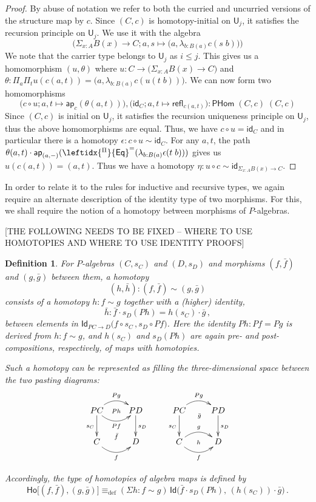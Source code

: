 \documentclass[10pt,a4paper,oneside,reqno]{amsart}
\numberwithin{equation}{section}
\theoremstyle{mythm}
\theoremstyle{mydef}
\newtheorem{definition}[theorem]{Definition}
\theoremstyle{myrmk}
\newcommand{\deq}{\equiv}
\newcommand{\defeq}{\deq_{\mathrm{def}}}
\newcommand{\idfun}[1]{\mathsf{id}_{#1}}
\newcommand{\comp}{\circ}
\newcommand{\ct}{\cdot}
\newcommand{\funext}{\leftidx{^\Pi}{\mathsf{Eq}}^{=}}
\newcommand{\prd}[1]{\Pi_{#1}}
\newcommand{\sm}[1]{\Sigma_{#1}}
\newcommand{\lam}[1]{\lambda_{#1}}
\newcommand{\app}{\mathsf{ap}}
\newcommand{\Id}{\mathsf{Id}}
\newcommand{\id}[1]{\Id_{#1}}
\newcommand{\refl}{\mathsf{refl}}
\newcommand{\UU}{\mathsf{U}}
\newcommand{\Ho}{\mathsf{Ho}}
\newcommand{\WHom}{\mathsf{PHom}}
\begin{document}
\begin{proof}
By abuse of notation we refer to both the curried and uncurried versions of the structure map by $c$. Since $(C,c)$ is homotopy-initial on $\UU_j$, it satisfies the recursion principle on $\UU_j$. We use it with the algebra \[\Big(\sm{x:A} B(x) \to C; a,s \mapsto \big(a,\lam{b:B(a)} c(s\;b)\big)\Big)\]
We note that the carrier type belongs to $\UU_j$ as $i \leq j$. This gives us a homomorphism $(u,\theta)$ where $u : C \to \big(\sm{x:A} B(x) \to C\big)$ and $\theta : \prd{a}\prd{t} u(c(a,t)) = \big(a,\lam{b:B(a)} c(u(t\;b))\big)$.  We can now form two homomorphisms
\[\big(c \comp u; a,t \mapsto \app_c(\theta(a,t))\big), \big(\idfun{C}; a,t \mapsto \refl_{c(a,t)}\big) : \WHom \; (C,c) \; (C,c)\]
Since $(C,c)$ is initial on $\UU_j$, it satisfies the recursion uniqueness principle on $\UU_j$, thus the above homomorphisms are equal. Thus, we have $c \comp u = \idfun{C}$ and in particular there is a homotopy $\epsilon : c \comp u \sim \idfun{C}$. For any $a,t$, the path $\theta(a,t) \ct \app_{(a,-)}(\funext(\lam{b:B(a)} \epsilon(t\;b)))$ gives us $u(c(a,t)) = (a,t)$. Thus we have a homotopy $\eta : u \comp c \sim \idfun{\sm{x:A} B(x) \to C}$.
\end{proof}



In order to relate it to the rules for inductive and recursive types, we again require an alternate description of the identity type of two morphisms. For this, we shall require the notion of a homotopy between morphisms of $P$-algebras. 

[THE FOLLOWING NEEDS TO BE FIXED -- WHERE TO USE HOMOTOPIES AND WHERE TO USE IDENTITY PROOFS]
\begin{definition}
For $P$-algebras $(C,s_C)$ and $(D,s_D)$ and morphisms $(f, \bar{f})$ and $(g, \bar{g})$ between them, a \emph{homotopy}  $$(h, \bar{h}) : (f, \bar{f}) \sim (g, \bar{g})$$
consists of a homotopy $h : f \sim g$ together with a (higher) identity, 
\[
\bar{h} : \bar{f} \cdot s_D(Ph) = h(s_C)\cdot \bar{g}\, ,
\]
between elements in $\id{PC \rightarrow D}\big( f \circ s_C \, ,  s_{D} \circ Pf \big)$.  Here the identity $Ph : Pf = Pg$ is derived from $h : f \sim g$, and $h(s_C)$ and $s_D(Ph)$ are again pre- and post-compositions, respectively, of maps with homotopies.

Such a homotopy can be represented as filling the three-dimensional space between the two pasting diagrams:
\[
\xymatrix{
PC \ar@/^1pc/[r]^{Pg}   \ar[d]_{s_C}   \ar@/_1pc/[r]_{Pf} \ar@{}[r]|{Ph}
& PD \ar[d]^{s_D}  \\
C  \ar@/_1pc/[r]_f  \ar@{}[r]^{\bar{f}} & D }
\qquad
\xymatrix{
PC \ar@/^1pc/[r]^{Pg}   \ar[d]_{s_C} \ar@{}[r]_(.52){\bar{g}}  & PD \ar[d]^{s_D}  \\
C \ar@/^1pc/[r]^g  \ar@/_1pc/[r]_f  \ar@{}[r]|{h} & D }
\]

Accordingly, the type of homotopies of algebra maps is defined by
\[
\Ho
\big[ (f,\bar{f}), (g, \bar{g})  \big]
 \defeq  
(\Sigma h:  f \sim g) \, \Id\big( \bar{f} \cdot s_D(Ph),\, (h(s_C))\cdot \bar{g} \big) \, .
\]
\end{definition}
\end{document}
